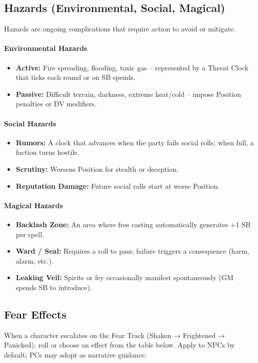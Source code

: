 \subsection{Hazards (Environmental, Social, Magical)}
Hazards are ongoing complications that require action to avoid or mitigate.

\paragraph{Environmental Hazards}
\begin{itemize}
  \item \textbf{Active:} Fire spreading, flooding, toxic gas -- represented by a Threat Clock that ticks each round or on SB spends.
  \item \textbf{Passive:} Difficult terrain, darkness, extreme heat/cold -- impose Position penalties or DV modifiers.
\end{itemize}

\paragraph{Social Hazards}
\begin{itemize}
  \item \textbf{Rumors:} A clock that advances when the party fails social rolls; when full, a faction turns hostile.
  \item \textbf{Scrutiny:} Worsens Position for stealth or deception.
  \item \textbf{Reputation Damage:} Future social rolls start at worse Position.
\end{itemize}

\paragraph{Magical Hazards}
\begin{itemize}
  \item \textbf{Backlash Zone:} An area where free casting automatically generates +1 SB per spell.
  \item \textbf{Ward / Seal:} Requires a roll to pass; failure triggers a consequence (harm, alarm, etc.).
  \item \textbf{Leaking Veil:} Spirits or fey occasionally manifest spontaneously (GM spends SB to introduce).
\end{itemize}

\subsection{Fear Effects}
When a character escalates on the Fear Track (Shaken → Frightened → Panicked), roll or choose an effect from the table below. Apply to NPCs by default; PCs may adopt as narrative guidance.

